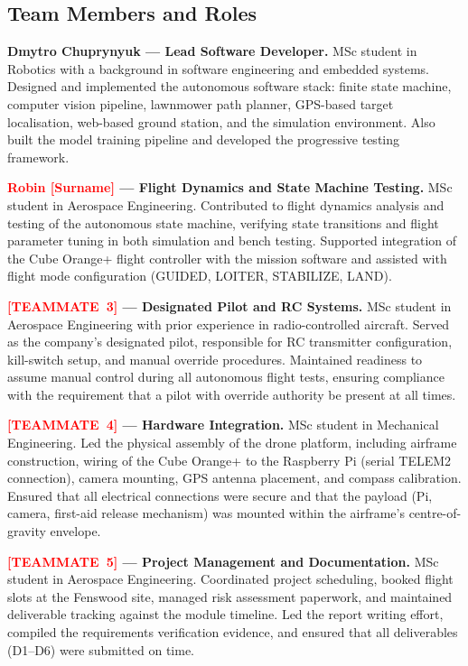 \subsection*{Team Members and Roles}

\textbf{Dmytro Chuprynyuk --- Lead Software Developer.}
MSc student in Robotics with a background in software engineering and embedded systems. Designed and implemented the autonomous software stack: finite state machine, computer vision pipeline, lawnmower path planner, GPS-based target localisation, web-based ground station, and the simulation environment. Also built the model training pipeline and developed the progressive testing framework.

\textbf{\textcolor{red}{Robin [Surname]} --- Flight Dynamics and State Machine Testing.}
MSc student in Aerospace Engineering. Contributed to flight dynamics analysis and testing of the autonomous state machine, verifying state transitions and flight parameter tuning in both simulation and bench testing. Supported integration of the Cube Orange+ flight controller with the mission software and assisted with flight mode configuration (GUIDED, LOITER, STABILIZE, LAND).

\textbf{\textcolor{red}{[TEAMMATE~3]} --- Designated Pilot and RC Systems.}
MSc student in Aerospace Engineering with prior experience in radio-controlled aircraft. Served as the company's designated pilot, responsible for RC transmitter configuration, kill-switch setup, and manual override procedures. Maintained readiness to assume manual control during all autonomous flight tests, ensuring compliance with the requirement that a pilot with override authority be present at all times.

\textbf{\textcolor{red}{[TEAMMATE~4]} --- Hardware Integration.}
MSc student in Mechanical Engineering. Led the physical assembly of the drone platform, including airframe construction, wiring of the Cube Orange+ to the Raspberry Pi (serial TELEM2 connection), camera mounting, GPS antenna placement, and compass calibration. Ensured that all electrical connections were secure and that the payload (Pi, camera, first-aid release mechanism) was mounted within the airframe's centre-of-gravity envelope.

\textbf{\textcolor{red}{[TEAMMATE~5]} --- Project Management and Documentation.}
MSc student in Aerospace Engineering. Coordinated project scheduling, booked flight slots at the Fenswood site, managed risk assessment paperwork, and maintained deliverable tracking against the module timeline. Led the report writing effort, compiled the requirements verification evidence, and ensured that all deliverables (D1--D6) were submitted on time.

